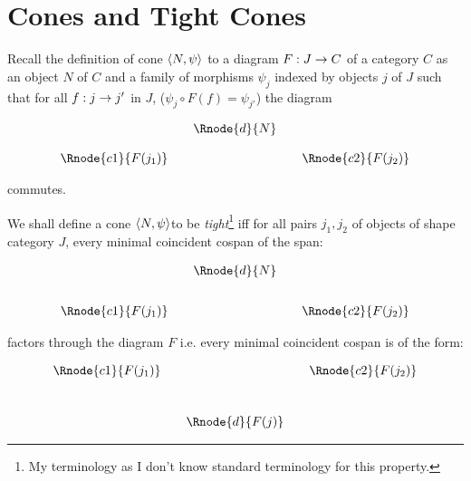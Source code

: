 \documentclass[10pt,a4paper]{scrartcl}
\begin{document}
\section{Cones and Tight Cones}
Recall the definition of cone $\langle N,\psi\rangle$ to a diagram $F:J \rightarrow C$ of a category $C$ as an object $N$ of $C$ and a family of morphisms $\psi_j$ indexed by objects $j$ of $J$ such that for all $f: j \rightarrow j'$ in $J$, ($\psi_j \circ F(f) = \psi_{j'}$) the diagram 
\begin{center}
\begin{equation}
\begin{array}{cp{0cm}cp{0cm}c}
                  &&\Rnode{d}{N}  &&                   \\ [0.4cm]
\Rnode{c1}{F(j_1)}&&              && \Rnode{c2}{F(j_2)} 
\end{array}
\end{equation}
\end{center}
commutes.

We shall define a cone $\langle N,\psi\rangle$to be \textit{tight}\footnote{My terminology as I don't know standard terminology for this property.} iff for all pairs $j_1,j_2$ of objects of shape category $J$, every minimal coincident cospan of the span:

\begin{center}
\begin{equation}
\begin{array}{cp{0cm}cp{0cm} c}
            & &\Rnode{d}{N}                           \\ [0.7cm]
\Rnode{c1}{F(j_1)}& &                & & \Rnode{c2}{F(j_2)} 
\end{array}
\end{equation}
\end{center}

\noindent factors through the diagram $F$ i.e. every minimal coincident cospan is of the form:
\begin{center}
\begin{equation}
\begin{array}{cp{0cm}cp{0cm} c}                        
\Rnode{c1}{F(j_1)}& &                & & \Rnode{c2}{F(j_2)} \\ [1.0cm]
            & &\Rnode{d}{F(j)}  
\end{array}
\end{equation}
\end{center}
\end{document}
